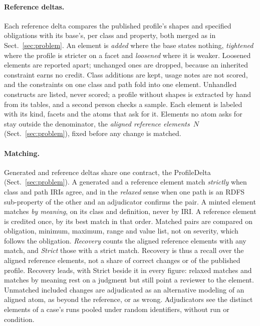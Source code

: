 \paragraph{Reference deltas.} Each reference delta compares the published profile's shapes and specified
obligations with its base's, per class and property, both merged as in Sect.~\ref{sec:problem}. An element is
\emph{added} where the base states nothing, \emph{tightened} where the profile is stricter on a facet and
\emph{loosened} where it is weaker. Loosened elements are reported apart; unchanged ones are dropped, because an
inherited constraint earns no credit.
Class additions are kept, usage notes are not scored, and the constraints on one class and path fold into one
element. Unhandled constructs are listed, never scored; a profile without shapes is extracted by hand from its
tables, and a second person checks a sample.  Each element
is labeled with its kind, facets and the atoms that ask for it. Elements no atom asks for stay outside the
denominator, the \emph{aligned reference elements}~$N$ (Sect.~\ref{sec:problem}), fixed before any change is
matched. 

\paragraph{Matching.} Generated and reference deltas share one contract, the ProfileDelta
(Sect.~\ref{sec:problem}). A generated and a reference element match \emph{strictly} when class and path
\acp{IRI} agree, and in the \emph{relaxed} sense when one path is an RDFS sub-property of the other and an
adjudicator confirms the pair. A minted element matches \emph{by meaning}, on its class and definition,
never by \ac{IRI}. %
A reference element is credited once, by its best match in that order. Matched pairs are compared on obligation,
minimum, maximum, range and value list, not on severity, which follows the obligation. %
\emph{Recovery} counts the aligned reference elements with any match, and \emph{Strict} those with a strict match.
Recovery is thus a recall over the aligned reference elements, not a share of correct changes or of the published
profile. Recovery leads, with Strict beside it in every figure: relaxed matches and matches by meaning rest on a
judgment but still point a reviewer to the element. Unmatched included changes are adjudicated as an alternative
modeling of an aligned atom, as beyond the reference, or as wrong. Adjudicators see the distinct elements of a
case's runs pooled under random identifiers, without run or condition. %
 
